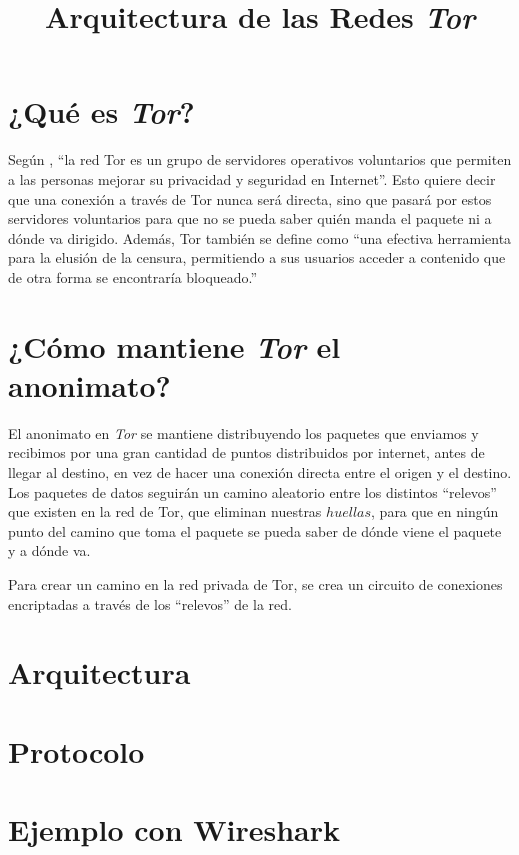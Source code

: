 \documentclass[10pt,a4paper,spanish]{article}
\title{\Huge Arquitectura de las Redes \textit{Tor}}
\begin{document}
\renewcommand{\tablename}{Tabla}
\maketitle

\section{¿Qué es \textit{Tor}?}
Según \cite{deftor}, ``la red Tor es un grupo de servidores operativos voluntarios que permiten a las personas mejorar su privacidad y seguridad en Internet''. Esto quiere decir que una conexión a través de Tor nunca será directa, sino que pasará por estos servidores voluntarios para que no se pueda saber quién manda el paquete ni a dónde va dirigido. Además, Tor también se define como ``una efectiva herramienta para la elusión de la censura, permitiendo a sus usuarios acceder a contenido que de otra forma se encontraría bloqueado.''

\section{¿Cómo mantiene \textit{Tor} el anonimato?}

El anonimato en \textit{Tor} se mantiene distribuyendo los paquetes que enviamos y recibimos por una gran cantidad de puntos distribuidos por internet, antes de llegar al destino, en vez de hacer una conexión directa entre el origen y el destino. Los paquetes de datos seguirán un camino aleatorio entre los distintos ``relevos'' que existen en la red de Tor, que eliminan nuestras $huellas$, para que en ningún punto del camino que toma el paquete se pueda saber de dónde viene el paquete y a dónde va.

Para crear un camino en la red privada de Tor, se crea un circuito de conexiones encriptadas a través de los ``relevos'' de la red.

\section{Arquitectura}

\section{Protocolo}

\section{Ejemplo con Wireshark}

\end{document}
